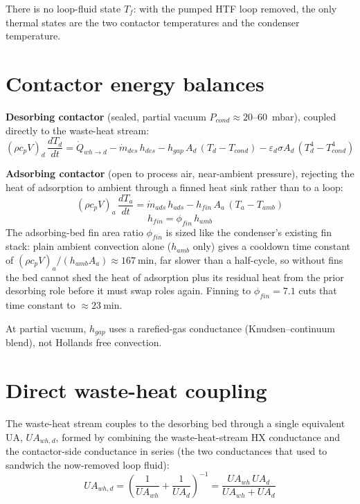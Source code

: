 \documentclass[11pt]{article}
\begin{document}
There is no loop-fluid state $T_f$: with the pumped HTF loop removed, the only thermal states are the two contactor temperatures and the condenser temperature.

\section{Contactor energy balances}

\textbf{Desorbing contactor} (sealed, partial vacuum $P_{cond} \approx 20$--$60$~mbar), coupled directly to the waste-heat stream:
\begin{equation}
(\rho c_p V)_{d}\,\frac{dT_d}{dt}
= \dot{Q}_{wh\to d}
- \dot{m}_{des}\,h_{des}
- h_{gap}\,A_d\,(T_d - T_{cond})
- \varepsilon_d\sigma A_d\,(T_d^4 - T_{cond}^4)
\label{eq:desorbing}
\end{equation}

\textbf{Adsorbing contactor} (open to process air, near-ambient pressure), rejecting the heat of adsorption to ambient through a finned heat sink rather than to a loop:
\begin{equation}
(\rho c_p V)_{a}\,\frac{dT_a}{dt}
= \dot{m}_{ads}\,h_{ads}
- h_{fin}\,A_a\,(T_a - T_{amb})
\label{eq:adsorbing}
\end{equation}
\begin{equation}
h_{fin} = \phi_{fin}\,h_{amb}
\end{equation}
The adsorbing-bed fin area ratio $\phi_{fin}$ is sized like the condenser's existing fin stack: plain ambient convection alone ($h_{amb}$ only) gives a cooldown time constant of $(\rho c_p V)_a / (h_{amb} A_a) \approx \SI{167}{\minute}$, far slower than a half-cycle, so without fins the bed cannot shed the heat of adsorption plus its residual heat from the prior desorbing role before it must swap roles again. Finning to $\phi_{fin} = 7.1$ cuts that time constant to $\approx \SI{23}{\minute}$.

At partial vacuum, $h_{gap}$ uses a rarefied-gas conductance (Knudsen--continuum blend), not Hollands free convection.

\section{Direct waste-heat coupling}

The waste-heat stream couples to the desorbing bed through a single equivalent UA, $UA_{wh,d}$, formed by combining the waste-heat-stream HX conductance and the contactor-side conductance in series (the two conductances that used to sandwich the now-removed loop fluid):
\begin{equation}
UA_{wh,d} = \left(\frac{1}{UA_{wh}} + \frac{1}{UA_{d}}\right)^{-1} = \frac{UA_{wh}\,UA_d}{UA_{wh} + UA_d}
\label{eq:uaeq}
\end{equation}
\end{document}
